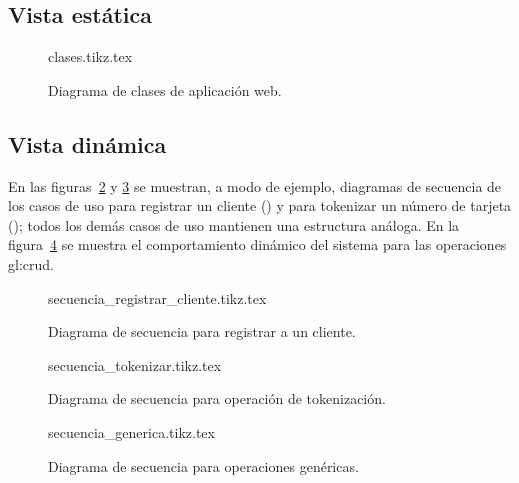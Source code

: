 \subsection{Vista estática}

\begin{figure}
  \begin{center}
    {clases.tikz.tex}
    \caption{Diagrama de clases de aplicación web.}
    \label{fig:clases_aplicacion_web}
  \end{center}
\end{figure}

\subsection{Vista dinámica}

En las figuras~\ref{fig:secuencia_registrar_cliente} y
\ref{fig:secuencia_tokenizar} se muestran, a modo de ejemplo, diagramas de
secuencia de los casos de uso para registrar un cliente
() y para tokenizar un número de tarjeta
(); todos los demás casos de uso mantienen
una estructura análoga. En la figura~\ref{fig:secuencia_generia} se muestra el
comportamiento dinámico del sistema para las operaciones \gls{gl:crud}.

%
%

\begin{figure}
  \begin{center}
    {secuencia_registrar_cliente.tikz.tex}
    \caption{Diagrama de secuencia para registrar a un cliente.}
    \label{fig:secuencia_registrar_cliente}
  \end{center}
\end{figure}

\begin{figure}
  \begin{center}
    {secuencia_tokenizar.tikz.tex}
    \caption{Diagrama de secuencia para operación de tokenización.}
    \label{fig:secuencia_tokenizar}
  \end{center}
\end{figure}

\begin{figure}
  \begin{center}
    {secuencia_generica.tikz.tex}
    \caption{Diagrama de secuencia para operaciones genéricas.}
    \label{fig:secuencia_generia}
  \end{center}
\end{figure}
